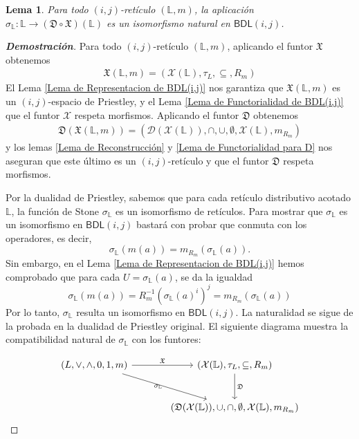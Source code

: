 \documentclass[12pt]{book}
\newtheorem{lemma}[theorem]{Lema}
\newcommand{\BDL}{\mathsf{BDL}}
\newcommand{\D}{\mathfrak{D}}
\begin{document}
\begin{lemma}\label{Lema de Equivalencia Natural para BDL} Para todo $(i,j)$-retículo $(\mathbb{L}, m)$, la aplicación
$\sigma_{\mathbb{L}} \colon \mathbb{L} \rightarrow (\D \circ \mathfrak{X})(\mathbb{L})$ es un isomorfismo natural en $\BDL(i,j)$.
\end{lemma}
\begin{proof}[\textbf{Demostración}]
Para todo $(i,j)$-retículo $(\mathbb{L}, m)$, aplicando el funtor $\mathfrak{X}$ obtenemos
\begin{align*}
    \mathfrak{X}(\mathbb{L}, m)=(\mathcal{X}(\mathbb{L}), \tau_L, \subseteq, R_m)
\end{align*}
El Lema \ref{Lema de Representacion de BDL(i,j)} nos garantiza que $\mathfrak{X}(\mathbb{L}, m)$ es un $(i,j)$-espacio de Priestley, y el Lema \ref{Lema de Functorialidad de BDL(i,j)} que el funtor $\mathcal{X}$ respeta morfismos. Aplicando el funtor $\D$ obtenemos
\begin{align*}
    \D(\mathfrak{X}(\mathbb{L}, m))=(\mathcal{D}(\mathcal{X}(\mathbb{L})),\cap,\cup,\emptyset,\mathcal{X}(\mathbb{L}),m_{R_m})
\end{align*}
y los lemas \ref{Lema de Reconstrucción} y \ref{Lema de Functorialidad para D} nos aseguran que este último es un $(i,j)$-retículo y que el funtor $\D$ respeta morfismos.

Por la dualidad de Priestley, sabemos que para cada retículo distributivo acotado $\mathbb{L}$, la función de Stone $\sigma_{\mathbb{L}}$ es un isomorfismo de retículos. Para mostrar que $\sigma_{\mathbb{L}}$ es un isomorfismo en $\BDL(i,j)$ bastará con probar que conmuta con los operadores, es decir,
\[ \sigma_{\mathbb{L}}(m(a))=m_{R_m}(\sigma_{\mathbb{L}}(a)). \]
Sin embargo, en el Lema \ref{Lema de Representacion de BDL(i,j)} hemos comprobado que para cada $U = \sigma_{\mathbb{L}}(a)$, se da la igualdad 
\[ \sigma_{\mathbb{L}}(m(a)) = R_{m}^{-1}\left( \sigma_{\mathbb{L}}(a)^{i} \right)^{j} = m_{R_{m}}(\sigma_{\mathbb{L}}(a)) \]
Por lo tanto, $\sigma_{\mathbb{L}}$ resulta un isomorfismo en $\BDL(i,j)$. La naturalidad se sigue de la probada en la dualidad de Priestley original. El siguiente diagrama muestra la compatibilidad natural de $\sigma_{\mathbb{L}}$ con los funtores:

\[
\begin{tikzcd}[row sep=large, column sep=large]
  (L, \vee, \wedge, 0, 1, m)
    \arrow[r, "\mathfrak{X}" above]
    \arrow[dr, "\sigma_{\mathbb{L}}" left]
  & (\mathcal{X}(\mathbb{L}), \tau_L, \subseteq, R_m)
    \arrow[d, "\D" right] \\
  & (\D(\mathcal{X}(\mathbb{L})), \cup, \cap, \emptyset, \mathcal{X}(\mathbb{L}), m_{R_m})
\end{tikzcd}
\]

\end{proof}
\end{document}
